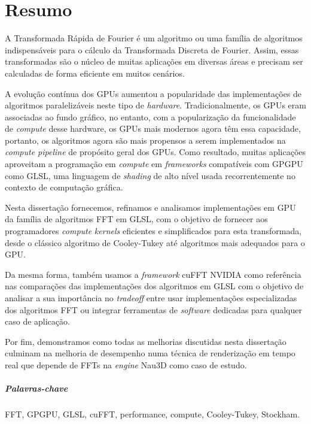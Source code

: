 \documentclass[
  oneside,
  11pt, a4paper,
  footinclude=true,
  headinclude=true,
  cleardoublepage=empty
]{scrbook}
\begin{document}
\chapter*{Resumo}

A Transformada Rápida de Fourier é um algoritmo ou uma família de algoritmos indispensáveis para o cálculo da Transformada Discreta de Fourier. Assim, essas transformadas são o núcleo de muitas aplicações em diversas áreas e precisam ser calculadas de forma eficiente em muitos cenários.

A evolução contínua dos GPUs aumentou a popularidade das implementações de algoritmos paralelizáveis neste tipo de \textit{hardware}. Tradicionalmente, os GPUs eram associadas ao fundo gráfico, no entanto, com a popularização da funcionalidade de \textit{compute} desse hardware, os GPUs mais modernos agora têm essa capacidade, portanto, os algoritmos agora são mais propensos a serem implementados na \textit{compute pipeline} de propósito geral dos GPUs. Como resultado, muitas aplicações aproveitam a programação em \textit{compute} em \textit{frameworks} compatíveis com GPGPU como GLSL, uma linguagem de \textit{shading} de alto nível usada recorrentemente no contexto de computação gráfica.
    
Nesta dissertação fornecemos, refinamos e analisamos implementações em GPU da família de algoritmos FFT em GLSL, com o objetivo de fornecer aos programadores \textit{compute} \textit{kernels} eficientes e simplificados para esta transformada, desde o clássico algoritmo de Cooley-Tukey até algoritmos mais adequados para o GPU.

Da mesma forma, também usamos a \textit{framework} cuFFT NVIDIA como referência nas comparações das implementações dos algoritmos em GLSL com o objetivo de analisar a sua importância no \textit{tradeoff} entre usar implementações especializadas dos algoritmos FFT ou integrar ferramentas de \textit{software} dedicadas para qualquer caso de aplicação.

Por fim, demonstramos como todas as melhorias discutidas nesta dissertação culminam na melhoria de desempenho numa técnica de renderização em tempo real que depende de FFTs na \textit{engine} Nau3D como caso de estudo.


\paragraph{Palavras-chave} FFT, GPGPU, GLSL, cuFFT, performance, compute, Cooley-Tukey, Stockham.
\end{document}
